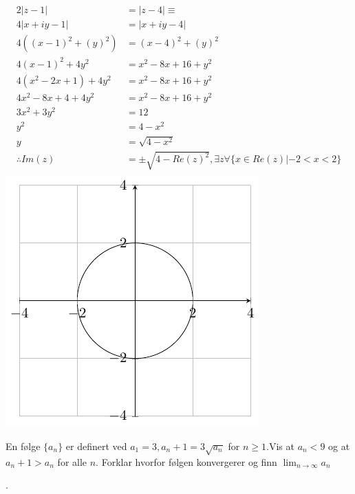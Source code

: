 \documentclass{myassignment}
\begin{document}
	\begin{answer}
		\begin{multicols}{2}
			\begin{align*}
				2|z-1| &= |z-4| \equiv \\[2em]
				4|x+iy-1| &= |x+iy-4|\\[1em]
				4((x-1)^2+(y)^2) &= (x-4)^2+(y)^2 \\[1em]
				4(x-1)^2+4y^2 &= x^2-8x+16+y^2 \\[1em]
				4(x^2-2x+1)+4y^2 &= x^2-8x+16+y^2 \\[1em]
				4x^2-8x+4 + 4y^2 &= x^2-8x+16+y^2 \\[1em]
				3x^2 + 3y^2 &= 12 \\[1em]
				y^2 &= 4 - x^2 \\[1em]
				y &= \sqrt{4 - x^2}\\[1em]
				\therefore Im(z) &= \pm\sqrt{4 - Re(z)^2}, \exists z \forall \{x \in Re(z) | -2 < x <2 \} \\[1em]
			\end{align*}
		\columnbreak
		\includegraphics{graphact4}

		\end{multicols}
	\end{answer}


	\begin{problem}
		En følge $\{ a_n \}$ er definert ved $a_1 = 3, a_n + 1 = 3\sqrt{a_n}$ for $n \geq 1$.Vis at $a_n < 9$ og at $a_n+1 > a_n$ for alle $n$. Forklar hvorfor følgen konvergerer og finn $\lim_{n \rightarrow \infty}{a_n}$
	\end{problem}

	\begin{answer}

	\end{answer}.
\end{document}
